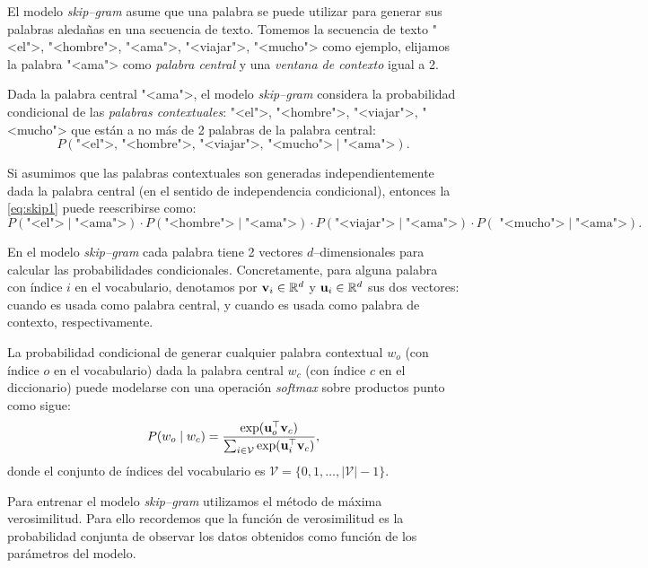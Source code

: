 \documentclass[12pt]{article}
\newcommand{\R}{\mathbb{R}}
\newcommand{\ce}{\bm{\textbf v}}
\newcommand{\co}{\bm{\textbf u}}
\begin{document}
El modelo \textit{skip--gram} asume que una palabra se puede utilizar para generar sus palabras aledañas en una secuencia de texto. Tomemos la secuencia de texto "<el">, "<hombre">, "<ama">, "<viajar">, "<mucho"> como ejemplo, elijamos la palabra "<ama"> como \textit{palabra central} y una \textit{ventana de contexto} igual a 2. 

Dada la palabra central "<ama">, el modelo \textit{skip--gram} considera la probabilidad condicional de las \textit{palabras contextuales}: "<el">, "<hombre">, "<viajar">, "<mucho"> que están a no más de 2 palabras de la palabra central:
\begin{equation}
    P(\text{"<el">, "<hombre">, "<viajar">, "<mucho">}\mid\text{"<ama">}). \label{eq:skip1}
\end{equation}

Si asumimos que las palabras contextuales son generadas independientemente dada la palabra central (en el sentido de independencia condicional), entonces la \cref{eq:skip1} puede reescribirse como:
\begin{equation}
    P(\text{"<el">}\mid\text{"<ama">}) \cdot P(\text{"<hombre">}\mid\text{"<ama">}) \cdot P(\text{"<viajar">}\mid\text{"<ama">}) \cdot P(\text{ "<mucho">}\mid\text{"<ama">}).
\end{equation}

En el modelo \textit{skip--gram} cada palabra tiene 2 vectores $ d $--dimensionales para calcular las probabilidades condicionales. Concretamente, para alguna palabra con índice $ i $ en el vocabulario, denotamos por $ \ce_i \in \R^{d} $ y $ \co_i \in \R^{d} $ sus dos vectores: cuando es usada como palabra central, y cuando es usada como palabra de contexto, respectivamente. 

La probabilidad condicional de generar cualquier palabra contextual $ w_o $ (con índice $ o $ en el vocabulario) dada la palabra central $ w_c $ (con índice $ c $ en el diccionario) puede modelarse con una operación \textit{softmax} sobre productos punto como sigue:
\begin{equation}
    P(w_o \mid w_c) = \frac{\exp(\co_o^{\top}\ce_c)}{\sum_{i \in \mathcal{V}}\exp(\co_i^{\top}\ce_c)},
\end{equation}
donde el conjunto de índices del vocabulario es $ \mathcal{V} = \{0, 1, \ldots, |\mathcal{V}| - 1\} $.


Para entrenar el modelo \textit{skip--gram} utilizamos el método de máxima verosimilitud. Para ello recordemos que la función de verosimilitud es la probabilidad conjunta de observar los datos obtenidos como función de los parámetros del modelo. 
\end{document}
